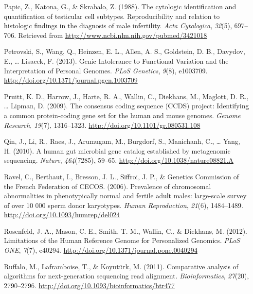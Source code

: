 \documentclass[12pt,twoside]{reedthesis}
\theoremstyle{definition}
\theoremstyle{definition}
\theoremstyle{remark}
\begin{document}
  \hypertarget{ref-Papic}{}
  Papic, Z., Katona, G., \& Skrabalo, Z. (1988). The cytologic
  identification and quantification of testicular cell subtypes.
  Reproducibility and relation to histologic findings in the diagnosis of
  male infertility. \emph{Acta Cytologica}, \emph{32}(5), 697--706.
  Retrieved from \url{http://www.ncbi.nlm.nih.gov/pubmed/3421018}
  
  \hypertarget{ref-Petrovski2013}{}
  Petrovski, S., Wang, Q., Heinzen, E. L., Allen, A. S., Goldstein, D. B.,
  Davydov, E., \ldots{} Lisacek, F. (2013). Genic Intolerance to
  Functional Variation and the Interpretation of Personal Genomes.
  \emph{PLoS Genetics}, \emph{9}(8), e1003709.
  \url{http://doi.org/10.1371/journal.pgen.1003709}
  
  \hypertarget{ref-Pruitt2009}{}
  Pruitt, K. D., Harrow, J., Harte, R. A., Wallin, C., Diekhans, M.,
  Maglott, D. R., \ldots{} Lipman, D. (2009). The consensus coding
  sequence (CCDS) project: Identifying a common protein-coding gene set
  for the human and mouse genomes. \emph{Genome Research}, \emph{19}(7),
  1316--1323. \url{http://doi.org/10.1101/gr.080531.108}
  
  \hypertarget{ref-Qin2010}{}
  Qin, J., Li, R., Raes, J., Arumugam, M., Burgdorf, S., Manichanh, C.,
  \ldots{} Yang, H. (2010). A human gut microbial gene catalog established
  by metagenomic sequencing. \emph{Nature}, \emph{464}(7285), 59--65.
  \url{http://doi.org/10.1038/nature08821.A}
  
  \hypertarget{ref-Ravel2006}{}
  Ravel, C., Berthaut, I., Bresson, J. L., Siffroi, J. P., \& Genetics
  Commission of the French Federation of CECOS. (2006). Prevalence of
  chromosomal abnormalities in phenotypically normal and fertile adult
  males: large-scale survey of over 10 000 sperm donor karyotypes.
  \emph{Human Reproduction}, \emph{21}(6), 1484--1489.
  \url{http://doi.org/10.1093/humrep/del024}
  
  \hypertarget{ref-Rosenfeld2012}{}
  Rosenfeld, J. A., Mason, C. E., Smith, T. M., Wallin, C., \& Diekhans,
  M. (2012). Limitations of the Human Reference Genome for Personalized
  Genomics. \emph{PLoS ONE}, \emph{7}(7), e40294.
  \url{http://doi.org/10.1371/journal.pone.0040294}
  
  \hypertarget{ref-Ruffalo2011}{}
  Ruffalo, M., Laframboise, T., \& Koyutürk, M. (2011). Comparative
  analysis of algorithms for next-generation sequencing read alignment.
  \emph{Bioinformatics}, \emph{27}(20), 2790--2796.
  \url{http://doi.org/10.1093/bioinformatics/btr477}
  
\end{document}
